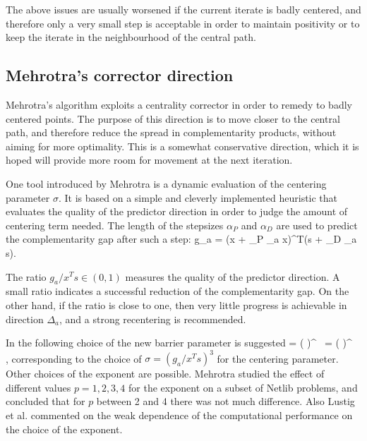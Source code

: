 The above issues are usually worsened if the current iterate is 
badly centered, 
and therefore only a very small step is acceptable in order to 
maintain positivity or to keep the iterate in the neighbourhood 
of the central path.

%
%
\subsection{Mehrotra's corrector direction}

Mehrotra's algorithm exploits a centrality corrector in order to 
remedy to badly centered points. The purpose of this direction is 
to move closer to the central path, and therefore reduce the spread 
in complementarity products, without aiming for more optimality. 
This is a somewhat conservative direction, which it is hoped will 
provide more room for movement at the next iteration.

One tool introduced by Mehrotra \cite{Mehrotra92} is a dynamic evaluation 
of the centering parameter $\sigma$. It is based on a simple and cleverly 
implemented heuristic that evaluates the quality of the predictor direction
in order to judge the amount of centering term needed.
%
The length of the stepsizes $\alpha_P$ and $\alpha_D$ are used to 
predict the complementarity gap after such a step:
\be \label{eq:PredictedGap}
  g_a = (x + \alpha_P \Delta_a x)^T(s + \alpha_D \Delta_a s).
\ee

The ratio $g_a / x^{T}s \in (0,1)$ measures the quality of the 
predictor direction.
A small ratio indicates a successful reduction of the complementarity 
gap. On the other hand, if the ratio is close to one, then very little 
progress is achievable in direction $\Delta_a$, and a strong recentering 
is recommended.

In \cite{Mehrotra92} the following choice of the new barrier parameter 
is suggested
%
\be \label{eq:Mu}
  \mu = \left(  \right)^{} \, 
           = \left(  \right)^{} \, ,
\ee
%
corresponding to the choice of $\sigma = (g_a / x^Ts)^3$ 
for the centering parameter. 
Other choices of the exponent are possible. Mehrotra \cite{Mehrotra92}
studied the effect of different values $p=1,2,3,4$ for the exponent
on a subset of Netlib problems, and concluded that for $p$ between
2 and 4 there was not much difference.
Also Lustig et al. \cite{LustigMarstenShanno} commented on the
weak dependence of the computational performance on the choice 
of the exponent.

